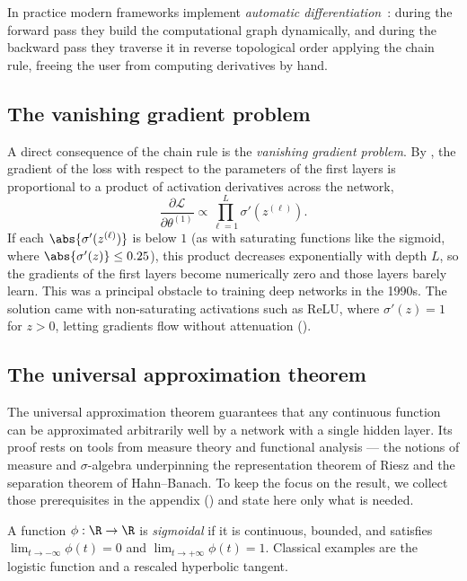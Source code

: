In practice modern frameworks implement \emph{automatic
differentiation}~\citep{Neidinger2010IntroductionTA}: during the forward pass
they build the computational graph dynamically, and during the backward pass they
traverse it in reverse topological order applying the chain rule, freeing the
user from computing derivatives by hand.

\subsection{The vanishing gradient problem}
\label{sec:found:vanishing}

A direct consequence of the chain rule is the \emph{vanishing gradient problem}.
By , the gradient of the loss with respect to the
parameters of the first layers is proportional to a product of activation
derivatives across the network,
\[
  \frac{\partial \mathcal{L}}{\partial \theta^{(1)}} \propto
  \prod_{\ell=1}^L \sigma'(z^{(\ell)}).
\]
If each $\abs{\sigma'(z^{(\ell)})}$ is below $1$ (as with saturating functions
like the sigmoid, where $\abs{\sigma'(z)} \le 0.25$), this product decreases
exponentially with depth $L$, so the gradients of the first layers become
numerically zero and those layers barely learn. This was a principal obstacle to
training deep networks in the 1990s. The solution came with non-saturating
activations such as ReLU, where $\sigma'(z) = 1$ for $z > 0$, letting gradients
flow without attenuation ().

\subsection{The universal approximation theorem}
\label{sec:found:universal}

The universal approximation theorem guarantees that any continuous function can
be approximated arbitrarily well by a network with a single hidden layer. Its
proof rests on tools from measure theory and functional analysis --- the notions
of measure and $\sigma$-algebra underpinning the representation theorem of Riesz
and the separation theorem of Hahn--Banach. To keep the focus on the result, we
collect those prerequisites in the appendix () and state here
only what is needed.

\begin{definition}
\label{def:found:sigmoidal}
A function $\phi : \R \to \R$ is \emph{sigmoidal} if it is continuous, bounded,
and satisfies $\lim_{t\to-\infty}\phi(t) = 0$ and
$\lim_{t\to+\infty}\phi(t) = 1$. Classical examples are the logistic function and
a rescaled hyperbolic tangent.
\end{definition}

